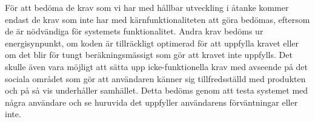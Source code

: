 För att bedöma de krav som vi har med hållbar utveckling i åtanke kommer endast de krav som inte har med kärnfunktionaliteten att göra bedömas, eftersom de är nödvändiga för systemets funktionalitet. Andra krav bedöms ur energisynpunkt, om koden är tillräckligt optimerad för att uppfylla kravet eller om det blir för tungt beräkningsmässigt som gör att kravet inte uppfylls. Det skulle även vara möjligt att sätta upp icke-funktionella krav med avseende på det sociala området som gör att användaren känner sig tillfredsställd med produkten och på så vis underhåller samhället. Detta bedöms genom att testa systemet med några användare och se huruvida det uppfyller användarens förväntningar eller inte. 


